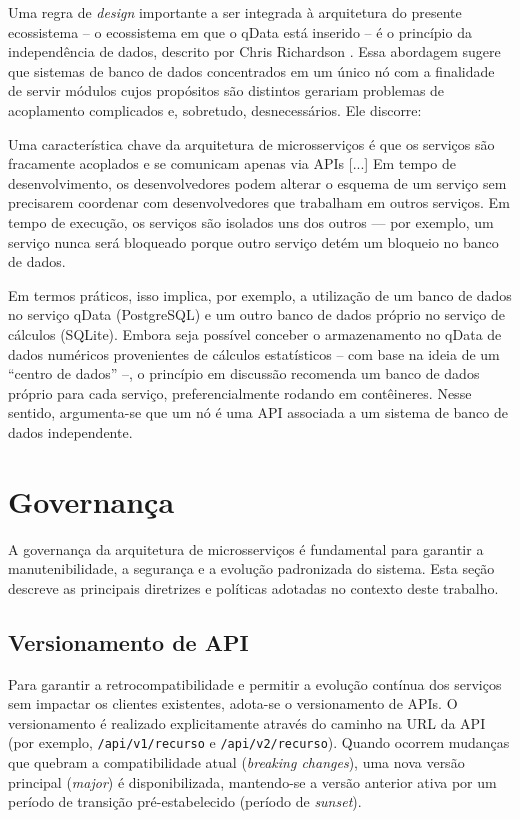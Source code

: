 Uma regra de \textit{design} importante a ser integrada à arquitetura do presente ecossistema – o ecossistema em que o qData está inserido – é o princípio da independência de dados, descrito por Chris Richardson \cite{newman2015building}. Essa abordagem sugere que sistemas de banco de dados concentrados em um único nó com a finalidade de servir módulos cujos propósitos são distintos gerariam problemas de acoplamento complicados e, sobretudo, desnecessários. Ele discorre:

\begin{citacao}
Uma característica chave da arquitetura de microsserviços é que os serviços são fracamente acoplados e se comunicam apenas via APIs [...] Em tempo de desenvolvimento, os desenvolvedores podem alterar o esquema de um serviço sem precisarem coordenar com desenvolvedores que trabalham em outros serviços. Em tempo de execução, os serviços são isolados uns dos outros — por exemplo, um serviço nunca será bloqueado porque outro serviço detém um bloqueio no banco de dados.
\end{citacao}

Em termos práticos, isso implica, por exemplo, a utilização de um banco de dados no serviço qData (PostgreSQL) e um outro banco de dados próprio no serviço de cálculos (SQLite). Embora seja possível conceber o armazenamento no qData de dados numéricos provenientes de cálculos estatísticos – com base na ideia de um ``centro de dados'' –, o princípio em discussão recomenda um banco de dados próprio para cada serviço, preferencialmente rodando em contêineres. Nesse sentido, argumenta-se que um nó é uma API associada a um sistema de banco de dados independente.

\section{Governança}

A governança da arquitetura de microsserviços é fundamental para garantir a manutenibilidade, a segurança e a evolução padronizada do sistema. Esta seção descreve as principais diretrizes e políticas adotadas no contexto deste trabalho.

\subsection{Versionamento de API}

Para garantir a retrocompatibilidade e permitir a evolução contínua dos serviços sem impactar os clientes existentes, adota-se o versionamento de APIs. O versionamento é realizado explicitamente através do caminho na URL da API (por exemplo, \texttt{/api/v1/recurso} e \texttt{/api/v2/recurso}). Quando ocorrem mudanças que quebram a compatibilidade atual (\textit{breaking changes}), uma nova versão principal (\textit{major}) é disponibilizada, mantendo-se a versão anterior ativa por um período de transição pré-estabelecido (período de \textit{sunset}).

